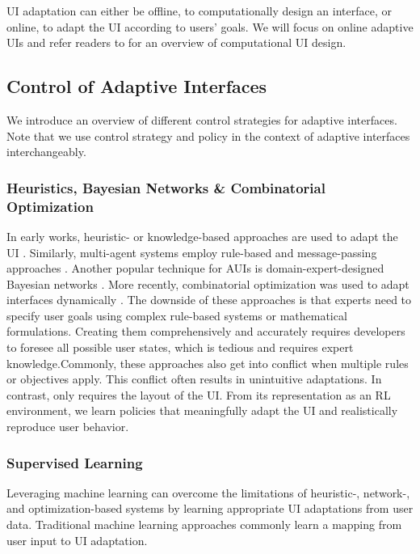 UI adaptation can either be offline, to computationally design an interface, or online, to adapt the UI according to users' goals. We will focus on online adaptive UIs and refer readers to \cite{combinatorialoptimizationdesign2020oulasvirta, functionalityselection2017oulasvirta} for an overview of computational UI design.
\subsection{Control of Adaptive Interfaces} We introduce an overview of different control strategies for adaptive interfaces. Note that we use control strategy and policy in the context of adaptive interfaces interchangeably.

\subsubsection{Heuristics, Bayesian Networks \& Combinatorial Optimization}
In early works, heuristic- or knowledge-based approaches are used to adapt the UI \cite{Browne1990,Stephanidis1997,Smith2010}. Similarly, multi-agent systems employ rule-based and message-passing approaches \citep{Rich1998,Rich2005,Yorke2012}. Another popular technique for AUIs is domain-expert-designed Bayesian networks \citep{Horvitz1998, Bosma2004}. More recently, combinatorial optimization was used to adapt interfaces dynamically \cite{park2018adam, lindlbauer2019context}. The downside of these approaches is that experts need to specify user goals using complex rule-based systems or mathematical formulations.
Creating them comprehensively and accurately requires developers to foresee all possible user states, which is tedious and requires expert knowledge.Commonly, these approaches also get into conflict when multiple rules or objectives apply. This conflict often results in unintuitive adaptations. In contrast, \marlui only requires the layout of the UI.
From its representation as an RL environment, we learn policies that meaningfully adapt the UI and realistically reproduce user behavior.

\subsubsection{Supervised Learning}
Leveraging machine learning can overcome the limitations of heuristic-, network-, and optimization-based systems by learning appropriate UI adaptations from user data.
Traditional machine learning approaches commonly learn a mapping from user input to UI adaptation.

